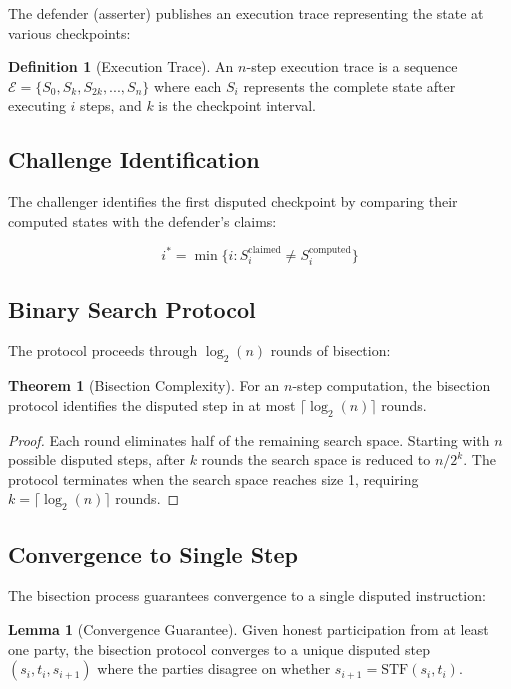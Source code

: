 \documentclass[11pt,a4paper]{article}
\theoremstyle{definition}
\newtheorem{definition}{Definition}[section]
\newtheorem{theorem}{Theorem}[section]
\newtheorem{lemma}{Lemma}[section]
\begin{document}
The defender (asserter) publishes an execution trace representing the state at various checkpoints:

\begin{definition}[Execution Trace]
An $n$-step execution trace is a sequence $\mathcal{E} = \{S_0, S_{k}, S_{2k}, ..., S_n\}$ where each $S_i$ represents the complete state after executing $i$ steps, and $k$ is the checkpoint interval.
\end{definition}

\subsection{Challenge Identification}

The challenger identifies the first disputed checkpoint by comparing their computed states with the defender's claims:

\begin{equation}
i^* = \min\{i : S_i^{\text{claimed}} \neq S_i^{\text{computed}}\}
\end{equation}

\subsection{Binary Search Protocol}

The protocol proceeds through $\log_2(n)$ rounds of bisection:

\begin{theorem}[Bisection Complexity]
For an $n$-step computation, the bisection protocol identifies the disputed step in at most $\lceil\log_2(n)\rceil$ rounds.
\end{theorem}

\begin{proof}
Each round eliminates half of the remaining search space. Starting with $n$ possible disputed steps, after $k$ rounds the search space is reduced to $n/2^k$. The protocol terminates when the search space reaches size 1, requiring $k = \lceil\log_2(n)\rceil$ rounds.
\end{proof}

\subsection{Convergence to Single Step}

The bisection process guarantees convergence to a single disputed instruction:

\begin{lemma}[Convergence Guarantee]
Given honest participation from at least one party, the bisection protocol converges to a unique disputed step $(s_i, t_i, s_{i+1})$ where the parties disagree on whether $s_{i+1} = \text{STF}(s_i, t_i)$.
\end{lemma}
\end{document}
